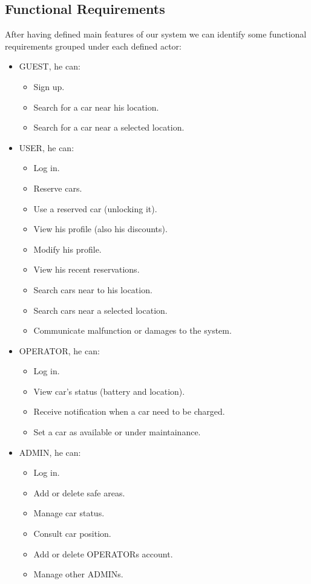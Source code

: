 \subsection{Functional Requirements}

After having defined main features of our system we can identify some
functional requirements grouped under each defined actor:
\begin{itemize}
\item GUEST, he can:
\begin{itemize}
\item Sign up.
\item Search for a car near his location.
\item Search for a car near a selected location.
\end{itemize}
\item USER, he can:
\begin{itemize}
\item Log in.
\item Reserve cars.
\item Use a reserved car (unlocking it).
\item View his profile (also his discounts).
\item Modify his profile.
\item View his recent reservations.
\item Search cars near to his location.
\item Search cars near a selected location.
\item Communicate malfunction or damages to the system.
\end{itemize}
\item OPERATOR, he can:
\begin{itemize}
\item Log in.
\item View car's status (battery and location).
\item Receive notification when a car need to be charged.
\item Set a car as available or under maintainance.
\end{itemize}
\item ADMIN, he can:
\begin{itemize}
\item Log in.
\item Add or delete safe areas.
\item Manage car status.
\item Consult car position.
\item Add or delete OPERATORs account.
\item Manage other ADMINs.
\end{itemize}
\end{itemize}

